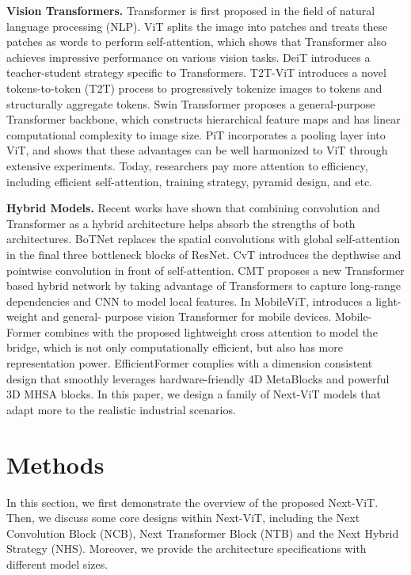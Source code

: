 \documentclass[10pt,twocolumn,letterpaper]{article}
\begin{document}
	\textbf{Vision Transformers.}
	Transformer is first proposed in the field of natural language processing (NLP). ViT\cite{ViT} splits the image into patches and treats these patches as words to perform self-attention, which shows that Transformer also achieves impressive performance on various vision tasks. DeiT\cite{Deit} introduces a teacher-student strategy specific to Transformers. T2T-ViT\cite{T2T} introduces a novel tokens-to-token (T2T) process to progressively tokenize images to tokens and structurally aggregate tokens. Swin Transformer\cite{Swin} proposes a general-purpose Transformer backbone, which constructs hierarchical feature maps and has linear computational complexity to image size. PiT\cite{PiT} incorporates a pooling layer into ViT, and shows that these advantages can be well harmonized to ViT through extensive experiments. Today, researchers pay more attention to efficiency, including efficient self-attention, training strategy, pyramid design, and etc.
	
	\textbf{Hybrid Models.}
	Recent works \cite{BoTNet,CvT,Cmt,MobileViT,li2022efficientformer, FAN} have shown that combining convolution and Transformer as a hybrid architecture helps absorb the strengths of both architectures.
	BoTNet\cite{BoTNet} replaces the spatial convolutions with global self-attention in the final three bottleneck blocks of ResNet. CvT\cite{CvT} introduces the depthwise and pointwise convolution in front of self-attention. CMT\cite{Cmt} proposes a new Transformer based hybrid network by taking advantage of Transformers to capture long-range dependencies and CNN to model local features.
	In MobileViT\cite{MobileViT}, introduces a light-weight and general- purpose vision Transformer for mobile devices. 
	Mobile-Former\cite{Mobile-Former} combines with the proposed lightweight cross attention to model the bridge, which is not only computationally efficient, but also has more representation power. EfficientFormer\cite{li2022efficientformer} complies with a dimension consistent design that smoothly leverages hardware-friendly 4D MetaBlocks and powerful 3D MHSA blocks. In this paper, we design a family of Next-ViT models that adapt more to the realistic industrial scenarios.
	

\section{Methods}
In this section, we first demonstrate the overview of the proposed Next-ViT.
Then, we discuss some core designs within Next-ViT, including the Next Convolution Block (NCB), Next Transformer Block (NTB) and the Next Hybrid Strategy (NHS). 
Moreover, we provide the architecture specifications with different model sizes.
\end{document}
